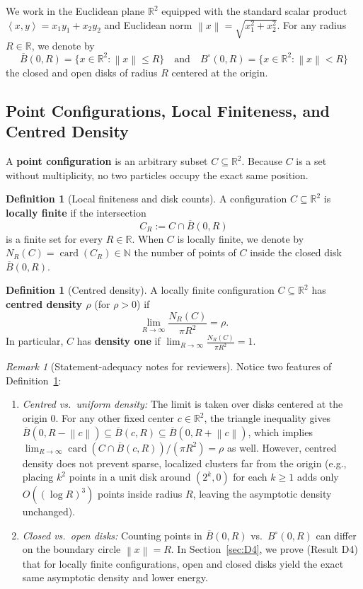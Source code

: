 \documentclass[11pt, a4paper]{article}
\theoremstyle{definition}
\newtheorem{definition}[theorem]{Definition}
\theoremstyle{remark}
\newtheorem{remark}[theorem]{Remark}
\newcommand{\R}{\mathbb{R}}
\newcommand{\N}{\mathbb{N}}
\newcommand{\Bbar}{\overline{B}}
\newcommand{\Bopen}{B^{\circ}}
\newcommand{\norm}[1]{\left\lVert #1 \right\rVert}
\newcommand{\inner}[2]{\left\langle #1, #2 \right\rangle}
\begin{document}
We work in the Euclidean plane $\R^2$ equipped with the standard scalar product $\inner{x}{y} = x_1 y_1 + x_2 y_2$ and Euclidean norm $\norm{x} = \sqrt{x_1^2 + x_2^2}$. For any radius $R \in \R$, we denote by
\[
\Bbar(0, R) = \{x \in \R^2 : \norm{x} \le R\} \quad \text{and} \quad \Bopen(0, R) = \{x \in \R^2 : \norm{x} < R\}
\]
the closed and open disks of radius $R$ centered at the origin.

\subsection{Point Configurations, Local Finiteness, and Centred Density}

A \textbf{point configuration} is an arbitrary subset $C \subseteq \R^2$. Because $C$ is a set without multiplicity, no two particles occupy the exact same position.

\begin{definition}[Local finiteness and disk counts]
A configuration $C \subseteq \R^2$ is \textbf{locally finite} if the intersection
\[
C_R := C \cap \Bbar(0, R)
\]
is a finite set for every $R \in \R$. When $C$ is locally finite, we denote by $N_R(C) = \operatorname{card}(C_R) \in \N$ the number of points of $C$ inside the closed disk $\Bbar(0, R)$.
\end{definition}

\begin{definition}[Centred density]
\label{def:density}
A locally finite configuration $C \subseteq \R^2$ has \textbf{centred density $\rho$} (for $\rho > 0$) if
\[
\lim_{R \to \infty} \frac{N_R(C)}{\pi R^2} = \rho.
\]
In particular, $C$ has \textbf{density one} if $\lim_{R \to \infty} \frac{N_R(C)}{\pi R^2} = 1$.
\end{definition}

\begin{remark}[Statement-adequacy notes for reviewers]
Notice two features of Definition~\ref{def:density}:
\begin{enumerate}[label=(\roman*)]
    \item \textit{Centred vs.\ uniform density:} The limit is taken over disks centered at the origin $0$. For any other fixed center $c \in \R^2$, the triangle inequality gives $\Bbar(0, R - \norm{c}) \subseteq \Bbar(c, R) \subseteq \Bbar(0, R + \norm{c})$, which implies $\lim_{R \to \infty} \operatorname{card}(C \cap \Bbar(c, R))/(\pi R^2) = \rho$ as well. However, centred density does not prevent sparse, localized clusters far from the origin (e.g., placing $k^2$ points in a unit disk around $(2^k, 0)$ for each $k \ge 1$ adds only $O((\log R)^3)$ points inside radius $R$, leaving the asymptotic density unchanged).
    \item \textit{Closed vs.\ open disks:} Counting points in $\Bbar(0, R)$ vs.\ $\Bopen(0, R)$ can differ on the boundary circle $\norm{x} = R$. In Section~\ref{sec:D4}, we prove (Result D4) that for locally finite configurations, open and closed disks yield the exact same asymptotic density and lower energy.
\end{enumerate}
\end{remark}
\end{document}
